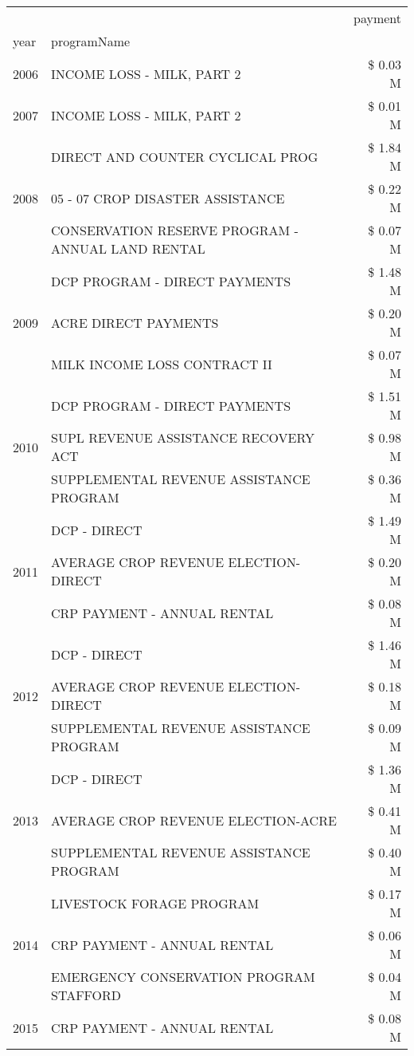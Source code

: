 \begin{tabular}{llr}
\toprule
 &  & payment \\
year & programName &  \\
\midrule
2006 & INCOME LOSS - MILK, PART 2 & \$ 0.03 M \\
\cline{1-3}
2007 & INCOME LOSS - MILK, PART 2 & \$ 0.01 M \\
\cline{1-3}
\multirow[t]{3}{*}{2008} & DIRECT AND COUNTER CYCLICAL PROG & \$ 1.84 M \\
 & 05 - 07 CROP DISASTER ASSISTANCE & \$ 0.22 M \\
 & CONSERVATION RESERVE PROGRAM - ANNUAL LAND RENTAL & \$ 0.07 M \\
\cline{1-3}
\multirow[t]{3}{*}{2009} & DCP PROGRAM - DIRECT PAYMENTS & \$ 1.48 M \\
 & ACRE DIRECT PAYMENTS & \$ 0.20 M \\
 & MILK INCOME LOSS CONTRACT II & \$ 0.07 M \\
\cline{1-3}
\multirow[t]{3}{*}{2010} & DCP PROGRAM - DIRECT PAYMENTS & \$ 1.51 M \\
 & SUPL REVENUE ASSISTANCE RECOVERY ACT & \$ 0.98 M \\
 & SUPPLEMENTAL REVENUE ASSISTANCE PROGRAM & \$ 0.36 M \\
\cline{1-3}
\multirow[t]{3}{*}{2011} & DCP - DIRECT & \$ 1.49 M \\
 & AVERAGE CROP REVENUE ELECTION-DIRECT & \$ 0.20 M \\
 & CRP PAYMENT - ANNUAL RENTAL & \$ 0.08 M \\
\cline{1-3}
\multirow[t]{3}{*}{2012} & DCP - DIRECT & \$ 1.46 M \\
 & AVERAGE CROP REVENUE ELECTION-DIRECT & \$ 0.18 M \\
 & SUPPLEMENTAL REVENUE ASSISTANCE PROGRAM & \$ 0.09 M \\
\cline{1-3}
\multirow[t]{3}{*}{2013} & DCP - DIRECT & \$ 1.36 M \\
 & AVERAGE CROP REVENUE ELECTION-ACRE & \$ 0.41 M \\
 & SUPPLEMENTAL REVENUE ASSISTANCE PROGRAM & \$ 0.40 M \\
\cline{1-3}
\multirow[t]{3}{*}{2014} & LIVESTOCK FORAGE PROGRAM & \$ 0.17 M \\
 & CRP PAYMENT - ANNUAL RENTAL & \$ 0.06 M \\
 & EMERGENCY CONSERVATION PROGRAM STAFFORD & \$ 0.04 M \\
\cline{1-3}
\multirow[t]{3}{*}{2015} & CRP PAYMENT - ANNUAL RENTAL & \$ 0.08 M \\

\end{tabular}
